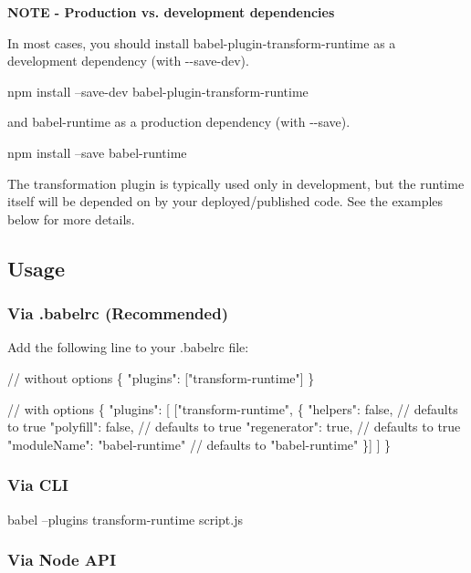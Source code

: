 {\bfseries N\+O\+TE -\/ Production vs. development dependencies}

In most cases, you should install {\ttfamily babel-\/plugin-\/transform-\/runtime} as a development dependency (with {\ttfamily -\/-\/save-\/dev}).


\begin{DoxyCode}
npm install --save-dev babel-plugin-transform-runtime
\end{DoxyCode}


and {\ttfamily babel-\/runtime} as a production dependency (with {\ttfamily -\/-\/save}).


\begin{DoxyCode}
npm install --save babel-runtime
\end{DoxyCode}


The transformation plugin is typically used only in development, but the runtime itself will be depended on by your deployed/published code. See the examples below for more details.

\subsection*{Usage}

\subsubsection*{Via {\ttfamily .babelrc} (Recommended)}

Add the following line to your {\ttfamily .babelrc} file\+:


\begin{DoxyCode}
// without options
\{
  "plugins": ["transform-runtime"]
\}

// with options
\{
  "plugins": [
    ["transform-runtime", \{
      "helpers": false, // defaults to true
      "polyfill": false, // defaults to true
      "regenerator": true, // defaults to true
      "moduleName": "babel-runtime" // defaults to "babel-runtime"
    \}]
  ]
\}
\end{DoxyCode}


\subsubsection*{Via C\+LI}


\begin{DoxyCode}
babel --plugins transform-runtime script.js
\end{DoxyCode}


\subsubsection*{Via Node A\+PI}


